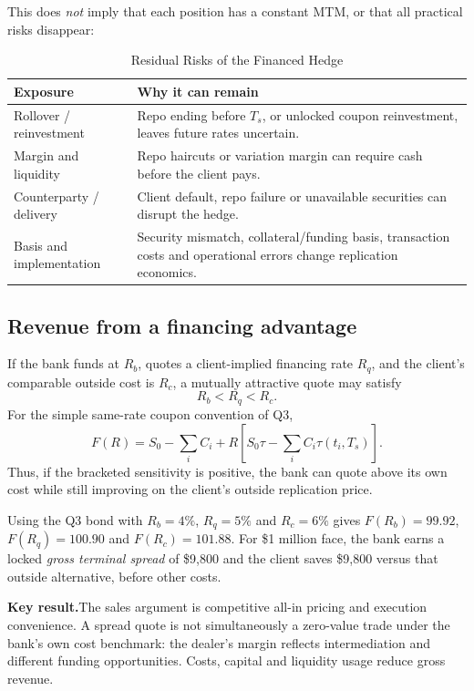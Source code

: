 \documentclass[11pt]{article}
\newcommand{\keynote}[1]{\par\medskip\noindent\textbf{\sffamily\color{NYUviolet}Key result.}\enspace #1\par\medskip}
\numberwithin{equation}{section}
\begin{document}
This does \emph{not} imply that each position has a constant MTM, or that all practical risks disappear:

\begin{table}[H]
\centering
\caption{Residual Risks of the Financed Hedge}
\label{tab:solution-6}
\small
\begin{tabularx}{\textwidth}{@{}L{3.0cm}Y@{}}
\toprule{}\textbf{Exposure} & \textbf{Why it can remain}\\\midrule
Rollover / reinvestment & Repo ending before $T_s$, or unlocked coupon reinvestment, leaves future rates uncertain.\\
Margin and liquidity & Repo haircuts or variation margin can require cash before the client pays.\\
Counterparty / delivery & Client default, repo failure or unavailable securities can disrupt the hedge.\\
Basis and implementation & Security mismatch, collateral/funding basis, transaction costs and operational errors change replication economics.\\\bottomrule
\end{tabularx}
\end{table}

\subsection{Revenue from a financing advantage}
If the bank funds at $R_b$, quotes a client-implied financing rate $R_q$, and the client's comparable outside cost is $R_c$, a mutually attractive quote may satisfy
\[
R_b<R_q<R_c.
\]
For the simple same-rate coupon convention of Q3,
\begin{equation}
F(R)=S_0-\sum_iC_i+R\left[S_0\tau-\sum_iC_i\tau(t_i,T_s)\right].
\end{equation}
Thus, if the bracketed sensitivity is positive, the bank can quote above its own cost while still improving on the client's outside replication price.

Using the Q3 bond with $R_b=4\%$, $R_q=5\%$ and $R_c=6\%$ gives $F(R_b)=99.92$, $F(R_q)=100.90$ and $F(R_c)=101.88$. For \$1 million face, the bank earns a locked \emph{gross terminal spread} of \$9,800 and the client saves \$9,800 versus that outside alternative, before other costs.

\keynote{The sales argument is competitive all-in pricing and execution convenience. A spread quote is not simultaneously a zero-value trade under the bank's own cost benchmark: the dealer's margin reflects intermediation and different funding opportunities. Costs, capital and liquidity usage reduce gross revenue.}
\end{document}
